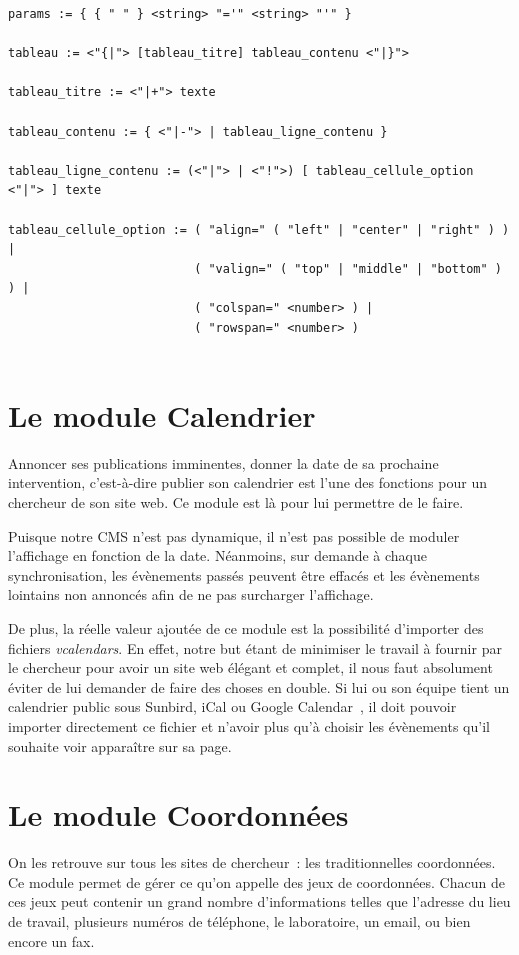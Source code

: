 \documentclass[final,11pt,a4paper,twoside,titlepage]{article}
\newcommand{\p}{\vspace{0.3em}}
\begin{document}
{\begin{verbatim}
params := { { " " } <string> "='" <string> "'" }

tableau := <"{|"> [tableau_titre] tableau_contenu <"|}">

tableau_titre := <"|+"> texte

tableau_contenu := { <"|-"> | tableau_ligne_contenu }

tableau_ligne_contenu := (<"|"> | <"!">) [ tableau_cellule_option <"|"> ] texte

tableau_cellule_option := ( "align=" ( "left" | "center" | "right" ) ) |
                          ( "valign=" ( "top" | "middle" | "bottom" ) ) |
                          ( "colspan=" <number> ) |
                          ( "rowspan=" <number> )
                                                   
  \end{verbatim}

  \section{Le module Calendrier}
    Annoncer ses publications imminentes, donner la date de sa prochaine intervention,
    c'est-à-dire publier son calendrier est l'une des fonctions pour un chercheur de 
    son site web. Ce module est là pour lui permettre de le faire.\p 

    Puisque notre CMS n'est pas dynamique, il n'est pas possible de moduler l'affichage
    en fonction de la date. Néanmoins, sur demande à chaque synchronisation,
	les évènements passés peuvent être effacés et les évènements lointains non annoncés 
    afin de ne pas surcharger l'affichage.\p

    De plus, la réelle valeur ajoutée de ce module est la possibilité d'importer des
    fichiers \emph{vcalendars}. En effet, notre but étant de minimiser le travail à 
    fournir par le chercheur pour avoir un site web élégant et complet, il nous faut 
    absolument éviter de lui demander de faire des choses en double. Si lui ou son 
    équipe tient un calendrier public sous Sunbird, iCal ou Google Calendar~, il doit
    pouvoir importer directement ce fichier et n'avoir plus qu'à choisir les évènements
    qu'il souhaite voir apparaître sur sa page.

  \section{Le module Coordonnées}
    On les retrouve sur tous les sites de chercheur~: les traditionnelles coordonnées.
    Ce module permet de gérer ce qu'on appelle des jeux de coordonnées. Chacun de ces 
    jeux peut contenir un grand nombre d'informations telles que l'adresse du lieu de
    travail, plusieurs numéros de téléphone, le laboratoire, un email, ou bien encore
    un fax.\p

}
\end{document}
